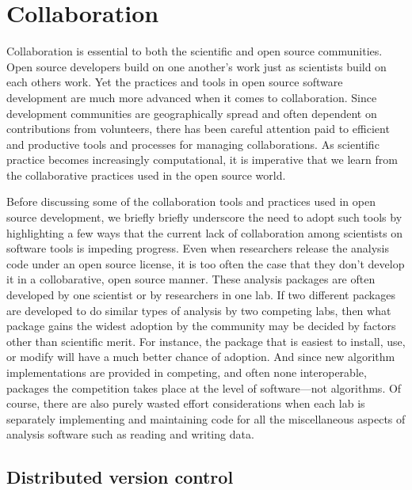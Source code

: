 \documentclass[ChapterTOCs,krantz2]{krantz} %
\theoremstyle{definition}
\begin{document}
\section{\label{sec:collaboration}Collaboration}

Collaboration is essential to both the scientific and open source communities.
Open source developers build on one another's work just as scientists build on
each others work.  Yet the practices and tools in open source software
development are much more advanced when it comes to collaboration. Since
development communities are geographically spread and often dependent on
contributions from volunteers, there has been careful attention paid to
efficient and productive tools and processes for managing collaborations.  As
scientific practice becomes increasingly computational, it is imperative that
we learn from the collaborative practices used in the open source world.

Before discussing some of the collaboration tools and practices used in open
source development, we briefly briefly underscore the need to adopt such tools
by highlighting a few ways that the current lack of collaboration among
scientists on software tools is impeding progress. Even when researchers
release the analysis code under an open source license, it is too often the
case that they don't develop it in a collobarative, open source manner.
These analysis packages are often developed by one scientist or by researchers
in one lab. If two different packages are developed to do similar types
of analysis by two competing labs, then what package gains the widest adoption
by the community may be decided by factors other than scientific merit. For
instance, the package that is easiest to install, use, or modify will have
a much better chance of adoption. And since new algorithm implementations
are provided in competing, and often none interoperable, packages the
competition takes place at the level of software---not algorithms. Of course,
there are also purely wasted effort considerations when each lab is separately
implementing and maintaining code for all the miscellaneous aspects of
analysis software such as reading and writing data.


\subsection{Distributed version control}
\end{document}
